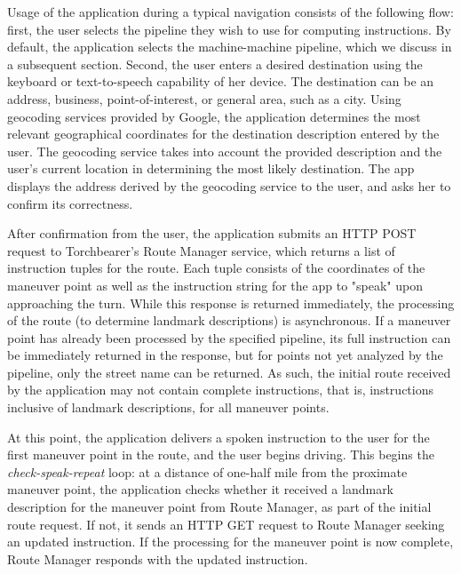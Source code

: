 Usage of the application during a typical navigation consists of the following flow: first, the user selects the pipeline they wish to use for computing instructions. By default, the application selects the machine-machine pipeline, which we discuss in a subsequent section. Second, the user enters a desired destination using the keyboard or text-to-speech capability of her device. The destination can be an address, business, point-of-interest, or general area, such as a city. Using geocoding services provided by Google, the application determines the most relevant geographical coordinates for the destination description entered by the user. The geocoding service takes into account the provided description and the user's current location in determining the most likely destination. The app displays the address derived by the geocoding service to the user, and asks her to confirm its correctness.

After confirmation from the user, the application submits an HTTP POST request to Torchbearer's Route Manager service, which returns a list of instruction tuples for the route. Each tuple consists of the coordinates of the maneuver point as well as the instruction string for the app to "speak" upon approaching the turn. While this response is returned immediately, the processing of the route (to determine landmark descriptions) is asynchronous. If a maneuver point has already been processed by the specified pipeline, its full instruction can be immediately returned in the response, but for points not yet analyzed by the pipeline, only the street name can be returned. As such, the initial route received by the application may not contain complete instructions, that is, instructions inclusive of landmark descriptions, for all maneuver points. 

At this point, the application delivers a spoken instruction to the user for the first maneuver point in the route, and the user begins driving. This begins the \textit{check-speak-repeat} loop: at a distance of one-half mile from the proximate maneuver point, the application checks whether it received a landmark description for the maneuver point from Route Manager, as part of the initial route request. If not, it sends an HTTP GET request to Route Manager seeking an updated instruction. If the processing for the maneuver point is now complete, Route Manager responds with the updated instruction. 

